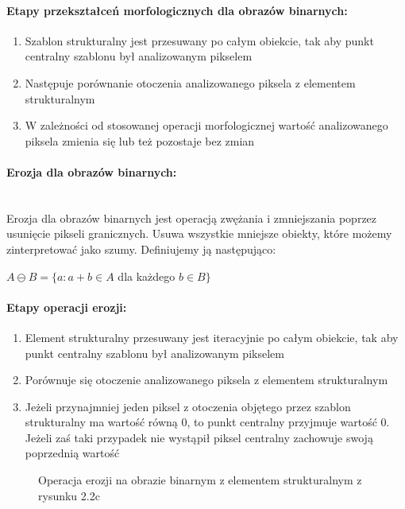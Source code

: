 \documentclass[a4paper,12pt,twoside,openany]{report}
\newcommand{\ImgPath}{.}
\begin{document}
\paragraph{Etapy przekształceń morfologicznych dla obrazów binarnych:}
\begin{enumerate}
	\item Szablon strukturalny jest przesuwany po całym obiekcie, tak aby punkt centralny szablonu był analizowanym pikselem
	\item Następuje porównanie otoczenia analizowanego piksela z elementem strukturalnym
	\item W zależności od stosowanej operacji morfologicznej wartość analizowanego piksela zmienia się lub też pozostaje bez zmian
\end{enumerate}

\paragraph{Erozja dla obrazów binarnych:}\mbox{} \\
\indent Erozja dla obrazów binarnych jest operacją zwężania i zmniejszania poprzez usunięcie pikseli granicznych. Usuwa wszystkie mniejsze obiekty, które możemy zinterpretować jako szumy. Definiujemy ją następująco:
\begin{center}
	$ A \ominus B = \{a \colon a + b \in A$ dla każdego $b \in B\} $ 
\end{center}

\paragraph{Etapy operacji erozji:}
\begin{enumerate}
	\item Element strukturalny przesuwany jest iteracyjnie po całym obiekcie,  tak aby punkt centralny szablonu był analizowanym pikselem
	\item Porównuje się otoczenie analizowanego piksela z elementem strukturalnym
	\item  Jeżeli przynajmniej jeden piksel z otoczenia objętego przez szablon strukturalny ma wartość równą 0, to punkt centralny przyjmuje wartość 0. Jeżeli zaś taki przypadek nie wystąpił piksel centralny zachowuje swoją poprzednią wartość
\end{enumerate}

\begin{figure}[H]
	\centering
	\caption{Operacja erozji na obrazie binarnym z elementem strukturalnym z rysunku 2.2c}
\end{figure}
\end{document}
